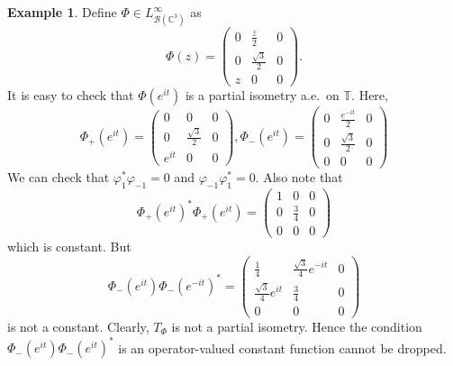 \documentclass[12pt]{amsart}
\newcommand{\clb}{\mathcal{B}}
\newcommand{\C}{\mathbb{C}}
\newcommand{\T}{\mathbb{T}}
\theoremstyle{definition}
\theoremstyle{plain}
\theoremstyle{definition}
\newtheorem{ex}[thm]{Example}
\numberwithin{equation}{section}
\let\phi=\varphi
\begin{document}
\begin{ex}
Define $\Phi \in L^\infty_{\clb(\C^3)}$ as
\[
\Phi(z)=\begin{pmatrix}
0&\frac{\bar{z}}{2} & 0 \\
0 &\frac{\sqrt{3}}{2} &0\\
z & 0 & 0
\end{pmatrix}.
\]
It is easy to check that $\Phi(e^{it})$ is a partial isometry a.e.\ on $\T$.
Here,
\[
\Phi_+(e^{it})=\begin{pmatrix}
0& 0 & 0\\
0 &\frac{\sqrt{3}}{2} &0\\
e^{it} &0 & 0
\end{pmatrix},
\Phi_-(e^{it})=\begin{pmatrix}
 0 &\frac{e^{-it}}{2}&0\\
0 &\frac{\sqrt{3}}{2} &0\\
0 &0 &0 
\end{pmatrix}
\]
We can check that $\phi_1^*\phi_{-1}=0$ and $\phi_{-1}\phi_1^*=0.$
Also note that
\[
\Phi_+(e^{it})^*\Phi_+(e^{it})=
\begin{pmatrix}
1 & 0& 0\\
0&\frac{3}{4}&0\\
0&0&0
\end{pmatrix}
\]
which is constant. But
\[
\Phi_-(e^{it})\Phi_-(e^{-it})^*=
\begin{pmatrix}
\frac{1}{4} & \frac{\sqrt{3}}{4}e^{-it}& 0\\
\frac{\sqrt{3}}{4}e^{it}&\frac{3}{4}&0\\
0&0&0
\end{pmatrix}
\]
is not a constant. Clearly, $T_\Phi$ is not a partial isometry. Hence the condition $\Phi_-(e^{it})\Phi_-(e^{it})^*$ is an operator-valued constant function cannot be dropped. 
\end{ex}
\end{document}
